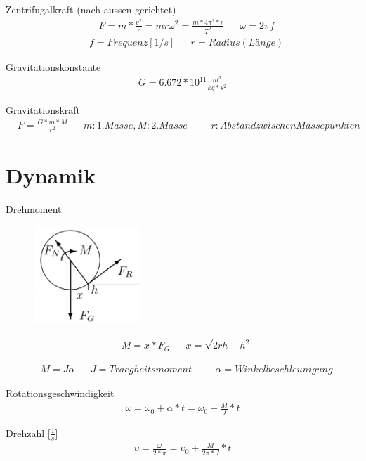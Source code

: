 \documentclass[17pt]{extarticle}
\begin{document}
	Zentrifugalkraft (nach aussen gerichtet)
	\begin{align}
		&F = m * \frac{v^2}{r} = m r \omega^2 = \frac{m * 4 \pi^2 * r}{T^2}
		&&\omega = 2 \pi f
	\end{align}
	\begin{align}
		& f = Frequenz [1/s]
		&& r = Radius (Länge)
	\end{align}
	
	Gravitationskonstante
	\begin{align}
		G = 6.672 * 10^{11} \frac{m^3}{kg*s^2}
	\end{align}
	
	Gravitationskraft
	\begin{align}
		&F = \frac{G * m * M}{r^2}
		&&m: 1. Masse, M: 2. Masse
		&&&r: Abstand zwischen Massepunkten
	\end{align}
	
\section{Dynamik}
	Drehmoment
	\begin{figure}[h!]
		\centering
		\includegraphics[width=4cm]{img/Drehmoment.png}
	\end{figure}

	\begin{align}
		&M = x*F_{G}
		&&x = \sqrt{2rh - h^2}
	\end{align}
	
	\begin{align}
		&M = J \alpha
		&&J = Traegheitsmoment
		&&&\alpha = Winkelbeschleunigung
	\end{align}
	
	Rotationsgeschwindigkeit
	\begin{align}
		\omega = \omega_{0} + \alpha * t = \omega_{0} + \frac{M}{J} * t
	\end{align}
	
	Drehzahl [$\frac{1}{s}$]
	\begin{align}
		\upsilon = \frac{\omega}{2 * \pi} = \upsilon_{0} + \frac{M}{2\pi * J} * t 
	\end{align}
	
\end{document}
